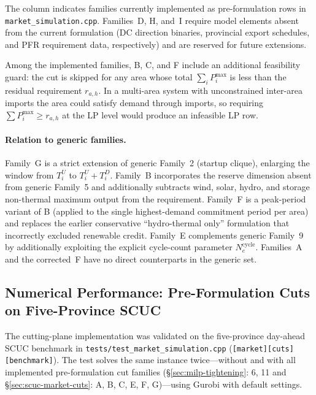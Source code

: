 The \checkmark{} column indicates families currently implemented as
pre-formulation rows in \texttt{market\_simulation.cpp}.
Families~D, H, and~I require model elements absent from the current
formulation (DC direction binaries, provincial export schedules, and PFR
requirement data, respectively) and are reserved for future extensions.

Among the implemented families, B, C, and F include an additional
feasibility guard: the cut is skipped for any area whose total
$\sum_{i} P^{\max}_i$ is less than the residual requirement $r_{a,h}$.
In a multi-area system with unconstrained inter-area imports the area
could satisfy demand through imports, so requiring $\sum P^{\max}_i
\geq r_{a,h}$ at the LP level would produce an infeasible LP row.

\paragraph{Relation to generic families.}
Family~G is a strict extension of generic Family~2 (startup clique),
enlarging the window from $T^U_i$ to $T^U_i + T^D_i$.
Family~B incorporates the reserve dimension absent from generic Family~5
and additionally subtracts wind, solar, hydro, and storage non-thermal
maximum output from the requirement.
Family~F is a peak-period variant of B (applied to the single highest-demand
commitment period per area) and replaces the earlier conservative
``hydro-thermal only'' formulation that incorrectly excluded renewable credit.
Family~E complements generic Family~9 by additionally exploiting the
explicit cycle-count parameter $N^{\mathrm{cycle}}_e$.
Families~A and the corrected~F have no direct counterparts in the generic set.

\subsection{Numerical Performance: Pre-Formulation Cuts on Five-Province SCUC}
\label{sec:market-cuts-perf}

The cutting-plane implementation was validated on the five-province
day-ahead SCUC benchmark in
\texttt{tests/test\_market\_simulation.cpp}
(\texttt{[market][cuts][benchmark]}).
The test solves the same instance twice---without and with all implemented
pre-formulation cut families (\S\ref{sec:milp-tightening}: 6, 11 and
\S\ref{sec:scuc-market-cuts}: A, B, C, E, F, G)---using Gurobi with default
settings.

